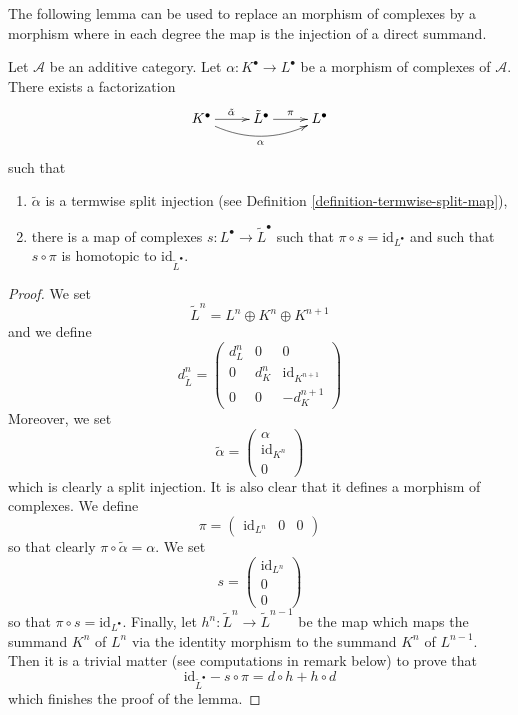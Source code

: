 \noindent
The following lemma can be used to replace an morphism of complexes
by a morphism where in each degree the map is the injection of a
direct summand.

\begin{lemma}
\label{lemma-make-injective}
Let $\mathcal{A}$ be an additive category.
Let $\alpha : K^\bullet \to L^\bullet$ be a morphism
of complexes of $\mathcal{A}$.
There exists a factorization
$$
\xymatrix{
K^\bullet \ar[r]^{\tilde \alpha} \ar@/_1pc/[rr]_\alpha &
\tilde L^\bullet \ar[r]^\pi &
L^\bullet
}
$$
such that
\begin{enumerate}
\item $\tilde \alpha$ is a termwise split injection (see
Definition \ref{definition-termwise-split-map}),
\item there is a map of complexes $s : L^\bullet \to \tilde L^\bullet$
such that $\pi \circ s = \text{id}_{L^\bullet}$ and such that
$s \circ \pi$ is homotopic to $\text{id}_{\tilde L^\bullet}$.
\end{enumerate}
\end{lemma}

\begin{proof}
We set
$$
\tilde L^n = L^n \oplus K^n \oplus K^{n + 1}
$$
and we define
$$
d^n_{\tilde L} =
\left(
\begin{matrix}
d^n_L & 0 & 0 \\
0 & d^n_K & \text{id}_{K^{n + 1}} \\
0 & 0 & -d^{n + 1}_K
\end{matrix}
\right)
$$
Moreover, we set
$$
\tilde \alpha =
\left(
\begin{matrix}
\alpha \\
\text{id}_{K^n} \\
0
\end{matrix}
\right)
$$
which is clearly a split injection. It is also clear that it defines a morphism
of complexes. We define
$$
\pi =
\left(
\begin{matrix}
\text{id}_{L^n} &
0 &
0
\end{matrix}
\right)
$$
so that clearly $\pi \circ \tilde \alpha = \alpha$. We set
$$
s =
\left(
\begin{matrix}
\text{id}_{L^n} \\
0 \\
0
\end{matrix}
\right)
$$
so that $\pi \circ s = \text{id}_{L^\bullet}$. Finally,
let $h^n : \tilde L^n \to \tilde L^{n - 1}$ be the map
which maps the summand $K^n$ of $L^n$ via the identity morphism
to the summand $K^n$ of $L^{n - 1}$. Then it is a trivial matter
(see computations in remark below) to prove that
$$
\text{id}_{\tilde L^\bullet} - s \circ \pi
=
d \circ h + h \circ d
$$
which finishes the proof of the lemma.
\end{proof}

